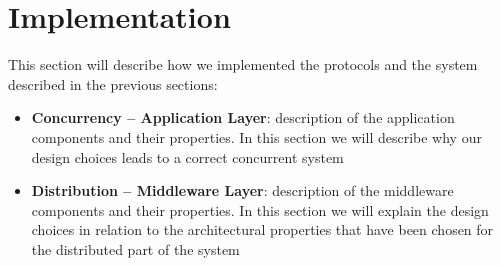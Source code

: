 \section{Implementation}

This section will describe how we implemented the protocols and the system
described in the previous sections:

\begin{itemize}
\item \textbf{Concurrency -- Application Layer}:
  description of the application components and their properties. In this
  section we will describe why our design choices leads to a correct concurrent
  system
\item \textbf{Distribution -- Middleware Layer}:
  description of the middleware components and their properties. In this
  section we will explain the design choices in relation to the architectural
  properties that have been chosen for the distributed part of the system
\end{itemize}




